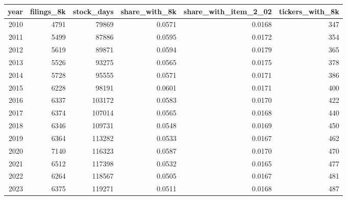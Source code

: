 \begin{tabular}{rrrrrr}
\toprule
year & filings\_8k & stock\_days & share\_with\_8k & share\_with\_item\_2\_02 & tickers\_with\_8k \\
\midrule
2010 & 4791 & 79869 & 0.0571 & 0.0168 & 347 \\
2011 & 5499 & 87886 & 0.0595 & 0.0172 & 354 \\
2012 & 5619 & 89871 & 0.0594 & 0.0179 & 365 \\
2013 & 5526 & 93275 & 0.0565 & 0.0175 & 378 \\
2014 & 5728 & 95555 & 0.0571 & 0.0171 & 386 \\
2015 & 6228 & 98191 & 0.0601 & 0.0171 & 400 \\
2016 & 6337 & 103172 & 0.0583 & 0.0170 & 422 \\
2017 & 6374 & 107014 & 0.0565 & 0.0168 & 440 \\
2018 & 6346 & 109731 & 0.0548 & 0.0169 & 450 \\
2019 & 6364 & 113282 & 0.0533 & 0.0167 & 462 \\
2020 & 7140 & 116323 & 0.0587 & 0.0170 & 470 \\
2021 & 6512 & 117398 & 0.0532 & 0.0165 & 477 \\
2022 & 6264 & 118567 & 0.0505 & 0.0167 & 481 \\
2023 & 6375 & 119271 & 0.0511 & 0.0168 & 487 \\
\bottomrule
\end{tabular}
